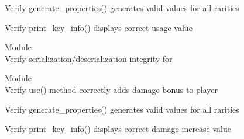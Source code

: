 \begin{DoxyRefList}
\label{test__test000051}%
%
Verify generate\+\_\+properties() generates valid values for all rarities  



\label{test__test000052}%
%
Verify print\+\_\+key\+\_\+info() displays correct usage value  


\item[Module \doxylink{group___tank_character}{Tank\+Character} ]\hfill \\
\label{test__test000113}%
%
Verify serialization/deserialization integrity for   


\item[Module \doxylink{group___weapon_card}{Weapon\+Card} ]\hfill \\
\label{test__test000042}%
%
Verify use() method correctly adds damage bonus to player  



\label{test__test000043}%
%
Verify generate\+\_\+properties() generates valid values for all rarities  



\label{test__test000044}%
%
Verify print\+\_\+key\+\_\+info() displays correct damage increase value  


\end{DoxyRefList}